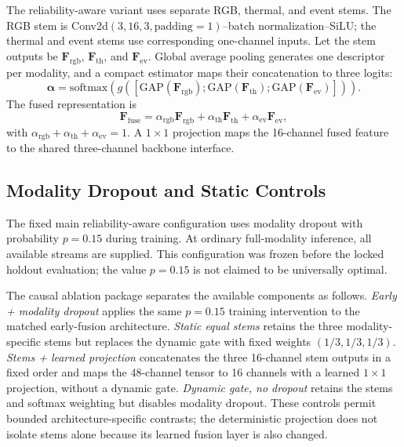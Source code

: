 The reliability-aware variant uses separate RGB, thermal, and event stems. The RGB stem is Conv2d$(3,16,3,\mathrm{padding}=1)$--batch normalization--SiLU; the thermal and event stems use corresponding one-channel inputs. Let the stem outputs be $\mathbf{F}_{\mathrm{rgb}}$, $\mathbf{F}_{\mathrm{th}}$, and $\mathbf{F}_{\mathrm{ev}}$. Global average pooling generates one descriptor per modality, and a compact estimator maps their concatenation to three logits:
\begin{equation}
\boldsymbol{\alpha}=\mathrm{softmax}\!\left(g\!\left([\mathrm{GAP}(\mathbf{F}_{\mathrm{rgb}});\mathrm{GAP}(\mathbf{F}_{\mathrm{th}});\mathrm{GAP}(\mathbf{F}_{\mathrm{ev}})]\right)\right).
\end{equation}
The fused representation is
\begin{equation}
\mathbf{F}_{\mathrm{fuse}}=\alpha_{\mathrm{rgb}}\mathbf{F}_{\mathrm{rgb}}+\alpha_{\mathrm{th}}\mathbf{F}_{\mathrm{th}}+\alpha_{\mathrm{ev}}\mathbf{F}_{\mathrm{ev}},
\end{equation}
with $\alpha_{\mathrm{rgb}}+\alpha_{\mathrm{th}}+\alpha_{\mathrm{ev}}=1$. A $1\times1$ projection maps the 16-channel fused feature to the shared three-channel backbone interface.

\subsection{Modality Dropout and Static Controls}

The fixed main reliability-aware configuration uses modality dropout with probability $p=0.15$ during training. At ordinary full-modality inference, all available streams are supplied. This configuration was frozen before the locked holdout evaluation; the value $p=0.15$ is not claimed to be universally optimal.

The causal ablation package separates the available components as follows. \emph{Early + modality dropout} applies the same $p=0.15$ training intervention to the matched early-fusion architecture. \emph{Static equal stems} retains the three modality-specific stems but replaces the dynamic gate with fixed weights $(1/3,1/3,1/3)$. \emph{Stems + learned projection} concatenates the three 16-channel stem outputs in a fixed order and maps the 48-channel tensor to 16 channels with a learned $1\times1$ projection, without a dynamic gate. \emph{Dynamic gate, no dropout} retains the stems and softmax weighting but disables modality dropout. These controls permit bounded architecture-specific contrasts; the deterministic projection does not isolate stems alone because its learned fusion layer is also changed.

